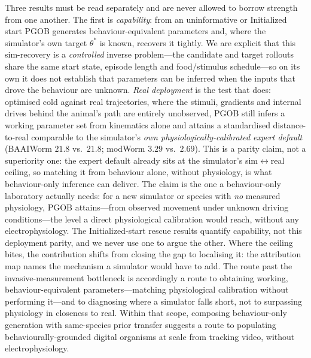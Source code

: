 \documentclass[11pt]{article}
\begin{document}
Three results must be read separately and are never allowed to borrow strength from one another. The first is \emph{capability}: from an uninformative or Initialized start PGOB generates behaviour-equivalent parameters and, where the simulator's own target $\theta^{*}$ is known, recovers it tightly. We are explicit that this sim-recovery is a \emph{controlled} inverse problem---the candidate and target rollouts share the same start state, episode length and food/stimulus schedule---so on its own it does not establish that parameters can be inferred when the inputs that drove the behaviour are unknown. \emph{Real deployment} is the test that does: optimised cold against real trajectories, where the stimuli, gradients and internal drives behind the animal's path are entirely unobserved, PGOB still infers a working parameter set from kinematics alone and attains a standardised distance-to-real comparable to the simulator's \emph{own physiologically-calibrated expert default} (BAAIWorm $21.8$ vs.\ $21.8$; modWorm $3.29$ vs.\ $2.69$). This is a parity claim, not a superiority one: the expert default already sits at the simulator's sim$\leftrightarrow$real ceiling, so matching it from behaviour alone, without physiology, is what behaviour-only inference can deliver. The claim is the one a behaviour-only laboratory actually needs: for a new simulator or species with \emph{no} measured physiology, PGOB attains---from observed movement under unknown driving conditions---the level a direct physiological calibration would reach, without any electrophysiology. The Initialized-start rescue results quantify capability, not this deployment parity, and we never use one to argue the other. Where the ceiling bites, the contribution shifts from closing the gap to localising it: the attribution map names the mechanism a simulator would have to add. The route past the invasive-measurement bottleneck is accordingly a route to obtaining working, behaviour-equivalent parameters---matching physiological calibration without performing it---and to diagnosing where a simulator falls short, not to surpassing physiology in closeness to real. Within that scope, composing behaviour-only generation with same-species prior transfer suggests a route to populating behaviourally-grounded digital organisms at scale from tracking video, without electrophysiology.
\end{document}
